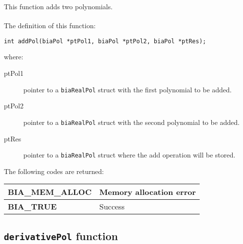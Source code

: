 This function adds two polynomials.\\ \\
%
The definition of this function:
%
\begin{verbatim}
int addPol(biaPol *ptPol1, biaPol *ptPol2, biaPol *ptRes);  
\end{verbatim}
%
where:
%
\begin{description}
\item[ptPol1] pointer to a \texttt{biaRealPol} struct with the first polynomial to be added.
\item[ptPol2] pointer to a \texttt{biaRealPol} struct with the second polynomial to be added.
\item[ptRes] pointer to a \texttt{biaRealPol} struct where the add operation will be stored.
\end{description}
%
The following codes are returned:
%
\begin{center}
\begin{tabular}{|l|l|}
\hline
\textbf{BIA\_MEM\_ALLOC} & Memory allocation error \\
\hline
\textbf{BIA\_TRUE} & Success \\
\hline
\end{tabular}
\end{center}
%
%

\subsection{\texttt{derivativePol} function}

